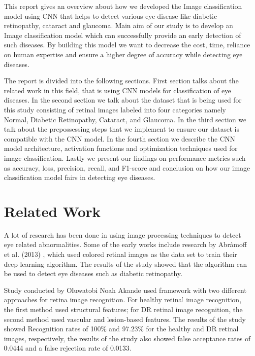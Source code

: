 \documentclass[conference]{IEEEtran}
\begin{document}
\vspace{5pt}
This report gives an overview about how we developed the Image classification model using CNN that helps to detect various eye disease like diabetic retinopathy, cataract and glaucoma. Main aim of our study is to develop an Image classification model which can successfully provide an early detection of such diseases. By building this model we want to decrease the cost, time, reliance on human expertise and ensure a higher degree of accuracy while detecting eye diseases.

\vspace{5pt}
The report is divided into the following sections. First section talks about the related work in this field, that is using CNN models for classification of eye diseases. In the second section we talk about the dataset that is being used for this study consisting of retinal images labeled into four categories namely Normal, Diabetic Retinopathy, Cataract, and Glaucoma. In the third section we talk about the prepossessing steps that we implement to ensure our dataset is compatible with the CNN model. In the fourth section we describe the CNN model architecture, activation functions and optimization techniques used for image classification. Lastly we present our findings on performance metrics such as accuracy, loss, precision, recall, and F1-score and conclusion on how our image classification model fairs in detecting eye diseases.

\section{Related Work}
A lot of research has been done in using image processing techniques to detect eye related abnormalities. Some of the early works include research by Abràmoff et al. (2013) \cite{b7}, which used colored retinal images as the data set to train their deep learning algorithm. The results of the study showed that the algorithm can be used to detect eye diseases such as diabetic retinopathy. 

\vspace{5pt}
Study conducted by Oluwatobi Noah Akande \cite{b8} used framework with two different approaches for retina image recognition. For healthy retinal image recognition, the first method used structural features; for DR retinal image recognition, the second method used vascular and lesion-based features. The results of the study showed Recognition rates of 100\% and 97.23\% for the healthy and DR retinal images, respectively, the results of the study also showed false acceptance rates of 0.0444 and a false rejection rate of 0.0133.
\end{document}
